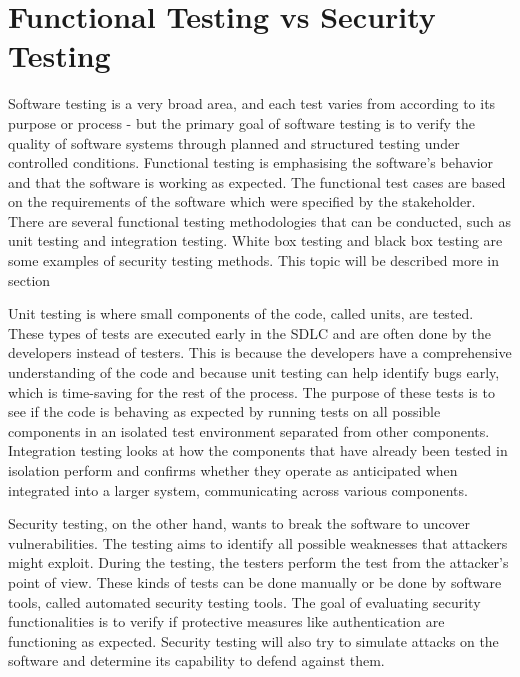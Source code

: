 \section{Functional Testing vs Security Testing}
Software testing is a very broad area, and each test varies from according to its purpose or process - but the primary goal of software testing is to verify the quality of software systems through planned and structured testing under controlled conditions. Functional testing is emphasising the software's behavior and that the software is working as expected. The functional test cases are based on the requirements of the software which were specified by the stakeholder. There are several functional testing methodologies that can be conducted, such as unit testing and integration testing. White box testing and black box testing are some examples of security testing methods. This topic will be described more in section %

Unit testing is where small components of the code, called units, are tested. These types of tests are executed early in the SDLC and are often done by the developers instead of testers. This is because the developers have a comprehensive understanding of the code and because unit testing can help identify bugs early, which is time-saving for the rest of the process. The purpose of these tests is to see if the code is behaving as expected by running tests on all possible components in an isolated test environment separated from other components. Integration testing looks at how the components that have already been tested in isolation perform and confirms whether they operate as anticipated when integrated into a larger system, communicating across various components.\cite{unitvsintergration}

Security testing, on the other hand, wants to break the software to uncover vulnerabilities. The testing aims to identify all possible weaknesses that attackers might exploit. During the testing, the testers perform the test from the attacker's point of view. These kinds of tests can be done manually or be done by software tools, called automated security testing tools. The goal of evaluating security functionalities is to verify if protective measures like authentication are functioning as expected. Security testing will also try to simulate attacks on the software and determine its capability to defend against them.\cite{whysectest}





